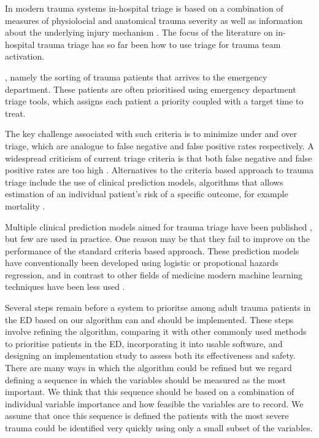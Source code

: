 \documentclass[10pt,letterpaper]{article}\usepackage[]{graphicx}\usepackage[]{color}
\begin{document}
In modern trauma systems in-hospital triage is based on a combination of
measures of physiolocial and anatomical trauma severity as well as information
about the underlying injury mechanism \cite{ASCOT2014}. The focus of the
literature on in-hospital trauma triage has so far been how to use triage for
trauma team activation.

, namely the sorting of trauma patients that arrives to the emergency
department. These patients are often prioritised using emergency department
triage tools, which assigns each patient a priority coupled with a target time
to treat.

The key challenge associated with such criteria is to minimize under and over
triage, which are analogue to false negative and false positive rates
respectively. A widespread criticism of current triage criteria is that both
false negative and false positive rates are too high
\cite{VanRein2018,Benjamin2018,Kristiansen2010}.  Alternatives to the criteria
based approach to trauma triage include the use of clinical prediction models,
algorithms that allows estimation of an individual patient's risk of a specific
outcome, for example mortality \cite{Collins2015}.

Multiple clinical prediction models aimed for trauma triage have been published
\cite{Rehn2011}, but few are used in practice. One reason may be that they fail
to improve on the performance of the standard criteria based approach. These
prediction models have conventionally been developed using logistic or
propotional hazards regression, and in contrast to other fields of medicine
modern machine learning techniques have been less used \cite{Liu2017}. 


Several steps remain before a system to prioritse among adult trauma patients in
the ED based on our algorithm can and should be implemented. These steps involve
refining the algorithm, comparing it with other commonly used methods to
prioritise patients in the ED, incorporating it into usable software, and
designing an implementation study to assess both its effectiveness and
safety. There are many ways in which the algorithm could be refined but we
regard defining a sequence in which the variables should be measured as the most
important. We think that this sequence should be based on a combination of
individual variable importance and how feasible the variables are to record. We
assume that once this sequence is defined the patients with the most severe
trauma could be identified very quickly using only a small subset of the
variables.
\end{document}
